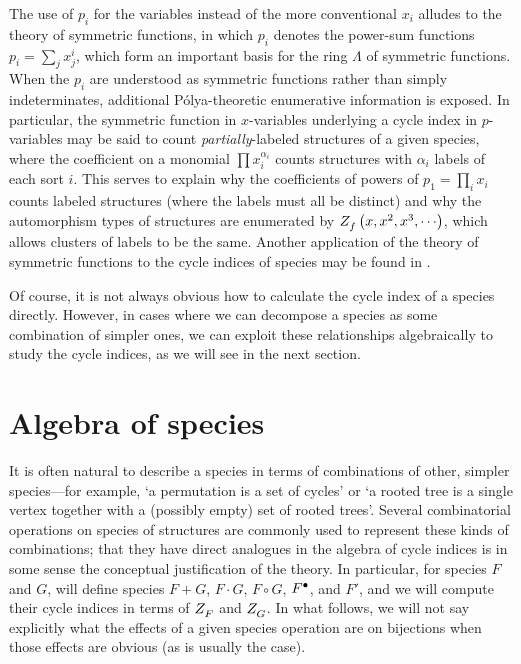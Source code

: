 \documentclass[sectionflow,singlespace,twoside,boldmathhdr,draft]{brandiss} %
\numberwithin{section}{chapter}
\numberwithin{figure}{chapter}
\begin{document}
The use of $p_{i}$ for the variables instead of the more conventional $x_{i}$ alludes to the theory of symmetric functions, in which $p_{i}$ denotes the power-sum functions $p_{i} = \sum_{j} x_{j}^{i}$, which form an important basis for the ring $\Lambda$ of symmetric functions.
When the $p_{i}$ are understood as symmetric functions rather than simply indeterminates, additional P\'{o}lya-theoretic enumerative information is exposed.
In particular, the symmetric function in $x$-variables underlying a cycle index in $p$-variables may be said to count \emph{partially}-labeled structures of a given species, where the coefficient on a monomial $\prod x_{i}^{\alpha_{i}}$ counts structures with $\alpha_{i}$ labels of each sort $i$.
This serves to explain why the coefficients of powers of $p_{1} = \prod_{i} x_{i}$ counts labeled structures (where the labels must all be distinct) and why the automorphism types of structures are enumerated by $ Z_{f}^{}  \left( {x, x^{2}, x^{3}, \cdots} \right)$, which allows clusters of labels to be the same.
Another application of the theory of symmetric functions to the cycle indices of species may be found in \cite{gessel:laginvspec}.

Of course, it is not always obvious how to calculate the cycle index of a species directly.
However, in cases where we can decompose a species as some combination of simpler ones, we can exploit these relationships algebraically to study the cycle indices, as we will see in the next section.

\section{Algebra of species}\label{s:specalg}
It is often natural to describe a species in terms of combinations of other, simpler species---for example, `a permutation is a set of cycles' or `a rooted tree is a single vertex together with a (possibly empty) set of rooted trees'.
Several combinatorial operations on species of structures are commonly used to represent these kinds of combinations; that they have direct analogues in the algebra of cycle indices is in some sense the conceptual justification of the theory.
In particular, for species $F$ and $G$, will define species $F + G$, $F \cdot G$, $F \circ G$, $ {F}^{\bullet } $, and $F'$, and we will compute their cycle indices in terms of $ Z_{F}^{} $ and $ Z_{G}^{} $.
In what follows, we will not say explicitly what the effects of a given species operation are on bijections when those effects are obvious (as is usually the case).
\end{document}
